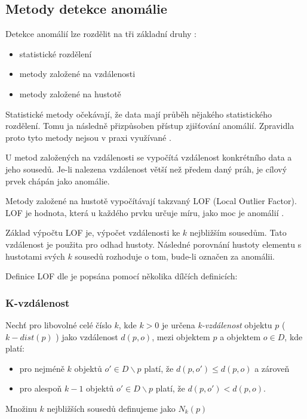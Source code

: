 \documentclass[thesis=M,czech]{FITthesis}[2012/10/20]
\begin{document}
		\subsection{Metody detekce anomálie}
			Detekce anomálií lze rozdělit na tři základní druhy \cite{KumarPCAANom}: 
			\begin{itemize} 
				\item statistické rozdělení
				\item metody založené na vzdálenosti 
				\item metody založené na hustotě		
			\end{itemize}
		
			Statistické metody očekávají, že data mají průběh nějakého statistického rozdělení. Tomu ja následně přizpůsoben přístup zjišťování anomálií. Zpravidla proto tyto metody nejsou v praxi využívané \cite{KumarPCAANom}.
			
			U metod založených na vzdálenosti se vypočítá vzdálenost konkrétního data a jeho sousedů. Je-li nalezena vzdálenost větší než předem daný práh, je cílový prvek chápán jako anomálie.
			
			Metody založené na hustotě vypočítávají takzvaný LOF (Local Outlier Factor). LOF je hodnota, která u každého prvku určuje míru, jako moc je anomálií \cite{LOF}.
			
			Základ výpočtu LOF je, výpočet vzdálenosti ke $k$ nejbližším sousedům. Tato vzdálenost je použita pro odhad hustoty. Následné porovnání hustoty elementu s hustotami svých $k$ sousedů rozhoduje o tom, bude-li označen za anomálii.
			
			Definice LOF dle \cite{LOF} je popsána pomocí několika dílčích definicích: 
			
			\subsubsection{K-vzdálenost}
				Nechť pro libovolné celé číslo $k$, kde $k > 0$ je určena \textit{k-vzdálenost} objektu $p$ ( $k-dist(p)$ ) jako vzdálenost $d(p, o)$, mezi objektem $p$ a objektem $o \in D$, kde platí:
			
				\begin{itemize} 
					\item pro nejméně $k$ objektů $o' \in D \backslash {p}$	platí, že $d(p, o') \leq d(p, o)$ a zároveň
					\item pro alespoň $k-1$ objektů $o' \in D \backslash {p}$ platí, že $d(p, o') < d(p, o)$.
				\end{itemize}
				Množinu $k$ nejbližších sousedů definujeme jako $N_k(p)$
		
\end{document}
